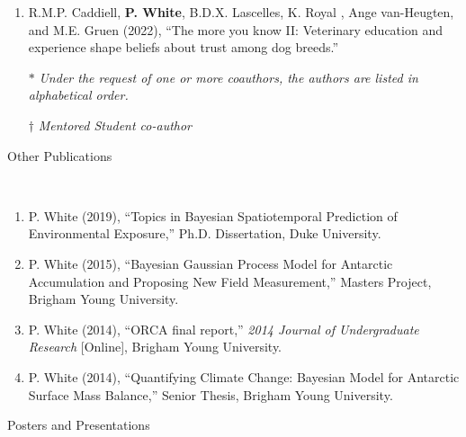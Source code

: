\documentclass[11pt]{article}
\newcommand{\head}[1]{ %
    \bigskip %
    \begin{large}\begin{bf}{#1}\end{bf}\end{large} %

    \ \\ [-1.3cm] %

    \hrulefill}
\begin{document}
\begin{enumerate}[label=$\bullet$]
\item  R.M.P. Caddiell, \textbf{P. White}, B.D.X. Lascelles, K. Royal , Ange van-Heugten, and M.E. Gruen (2022), ``The more you know II: Veterinary education and experience shape beliefs about trust among dog breeds.''
\setlength\itemsep{-1em} \\
\item[$*$] \textit{Under the request of one or more coauthors, the authors are listed in alphabetical order.}\\
\item[$\dagger$] \textit{Mentored Student co-author}
\end{enumerate}


%
%


\head{Other Publications}

\begin{enumerate}[label=$\bullet$]
\item P. White (2019), ``Topics in Bayesian Spatiotemporal Prediction of Environmental Exposure,'' Ph.D. Dissertation, Duke University.
\item P. White (2015), ``Bayesian Gaussian Process Model for Antarctic Accumulation and Proposing New Field Measurement,'' Masters Project, Brigham Young University.
\item P. White (2014), ``ORCA final report,'' \emph{2014 Journal of Undergraduate Research} [Online], Brigham Young University.
\item P. White (2014), ``Quantifying Climate Change: Bayesian Model for Antarctic Surface Mass Balance,'' Senior Thesis, Brigham Young University.
\end{enumerate}


\head{Posters and Presentations}
\end{document}
